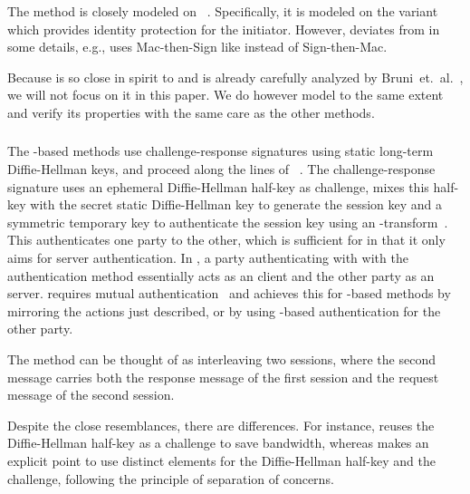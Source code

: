 \subsubsection{\mSigma{}}
\label{sec:sigma}
The \mSigSig{} method is closely modeled on \mSigma{}~\cite{sigma}.
%
Specifically, it is modeled on the \mSigmaI{} variant which provides identity
protection for the initiator.
%
However, \mSigSig{} deviates from \mSigmaI{} in some details, e.g.,
\mEdhoc{} uses Mac-then-Sign like \mTls{} instead of Sign-then-Mac.
%

Because \mSigSig{} is so close in spirit to \mSigmaI{} and is already carefully
analyzed by Bruni~et.~al.~\cite{DBLP:conf/secsr/BruniJPS18}, we will not focus
on it in this paper.
%
We do however model \mSigSig{} to the same extent and
verify its properties with the same care as the other methods.
%

\subsubsection{\mOptls{}}
\label{sec:optls}
The \mStat-based methods use challenge-response signatures using static
long-term Diffie-Hellman keys, and proceed along the lines of
\mOptls~\cite{cryptoeprint:2015:978}.
%
The challenge-response signature uses an ephemeral Diffie-Hellman half-key as
challenge, mixes this half-key with the secret static Diffie-Hellman key to
generate
the session key and a symmetric temporary key to authenticate the session key
using an \mAead{}-transform~\cite{aead,rfc5116,DBLP:conf/eurosp/KrawczykW16}.
%
This authenticates one party to the other, which is sufficient for \mOptls in
that it only aims for server authentication.
%
In \mEdhoc, a party authenticating with with the \mStat{} authentication method
essentially acts as an \mOptls{} client and the other party as an \mOptls{}
server.
%
\mEdhoc{} requires mutual authentication~\cite{ietf-lake-reqs-04} and achieves
this for \mStat{}-based methods by mirroring the actions just described, or
by using \mSig{}-based authentication for the other party.
%

The \mStatStat{} method can be thought of as interleaving two \mOptls{}
sessions, where the second \mEdhoc{} message carries both the response
message of the first \mOptls{} session and the request message of the second
\mOptls{} session.
%

Despite the close resemblances, there are differences.
%
For instance, \mEdhoc{} reuses the Diffie-Hellman half-key as a challenge to
save bandwidth, whereas \mOptls{} makes an explicit
point to use distinct elements for the Diffie-Hellman half-key and the
challenge, following the principle of separation of concerns.
%

